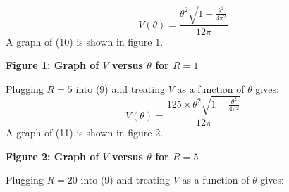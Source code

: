 \documentclass{article}
\begin{document}
\begin{itemize}
\begin{itemize}
\begin{equation}
            V(\theta)=\frac{\theta^2\sqrt{1-\frac{\theta^2}{4\pi^2}}}{12\pi}
        \end{equation}
        A graph of (10) is shown in figure 1.
        \newline
        
        \begin{center}
            \newline
            \textbf{Figure 1: Graph of \(V\) versus \(\theta\) for \(R=1\)}
        \end{center}
        
        Plugging \(R=5\) into (9) and treating \(V\) as a function of \(\theta\) gives:  
        \begin{equation}

            V(\theta)=\frac{125\times\theta^2\sqrt{1-\frac{\theta^2}{4\pi^2}}}{12\pi}
        \end{equation}
        A graph of (11) is shown in figure 2.
        \newline
        
        \begin{center}
            \newline
            \textbf{Figure 2: Graph of \(V\) versus \(\theta\) for \(R=5\)}
        \end{center}
        
        Plugging \(R=20\) into (9) and treating \(V\) as a function of \(\theta\) gives:  
        \begin{equation}


\end{equation}
\end{itemize}
\end{itemize}
\end{document}
